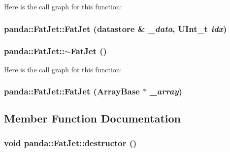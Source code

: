 Here is the call graph for this function:\hypertarget{classpanda_1_1FatJet_ad420844ffe922af3258fdae0a09c85d4}{
\subsubsection[{FatJet}]{\setlength{\rightskip}{0pt plus 5cm}panda::FatJet::FatJet ({\bf datastore} \& {\em \_\-data}, \/  UInt\_\-t {\em idx})}}
\label{classpanda_1_1FatJet_ad420844ffe922af3258fdae0a09c85d4}
\hypertarget{classpanda_1_1FatJet_a268ffcd09f28943adc44a71ee61a7066}{
\subsubsection[{$\sim$FatJet}]{\setlength{\rightskip}{0pt plus 5cm}panda::FatJet::$\sim$FatJet ()}}
\label{classpanda_1_1FatJet_a268ffcd09f28943adc44a71ee61a7066}


Here is the call graph for this function:\hypertarget{classpanda_1_1FatJet_a1b07ce37adb0afee46d0b0f76410db5b}{
\subsubsection[{FatJet}]{\setlength{\rightskip}{0pt plus 5cm}panda::FatJet::FatJet ({\bf ArrayBase} $\ast$ {\em \_\-array})}}
\label{classpanda_1_1FatJet_a1b07ce37adb0afee46d0b0f76410db5b}


\subsection{Member Function Documentation}
\hypertarget{classpanda_1_1FatJet_a421049d4b4315facb5bda39746f1a38b}{
\subsubsection[{destructor}]{\setlength{\rightskip}{0pt plus 5cm}void panda::FatJet::destructor ()}}
\label{classpanda_1_1FatJet_a421049d4b4315facb5bda39746f1a38b}


